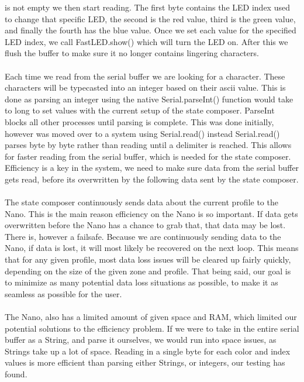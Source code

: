 \documentclass[onecolumn, draftclsnofoot,10pt, compsoc]{IEEEtran}
\begin{document}
	is not empty we then start reading. The first byte contains the LED index used
	to change that specific LED, the second is the red value, third is the green
	value, and finally the fourth has the blue value.  Once we set each value for
	the specified LED index, we call FastLED.show() which will turn the LED on.
	After this we flush the buffer to make sure it no longer contains lingering characters.
 	\\\\
	\noindent Each time we read from the serial buffer we are looking for a character. These
	characters will be typecasted into an integer based on their ascii value.
	This is done as parsing an integer using the native Serial.parseInt() function
	would take to long to set values with the current setup of the state composer.
	ParseInt blocks all other processes until parsing is complete. This was done
	initially, however was moved over to a system using Serial.read() instead
	Serial.read() parses byte by byte rather than reading until a delimiter is
	reached. This allows for faster reading from the serial buffer, which is
	needed for the state composer. Efficiency is a key in the system, we need to
	make sure data from the serial buffer gets read, before its overwritten by the
	following data sent by the state composer.
	\\\\
	\noindent The state composer continuously sends data about the current profile to the
	Nano. This is the main reason efficiency on the Nano is so important. If data
	gets overwritten before the Nano has a chance to grab that, that data may be
	lost. There is, however a failsafe. Because we are continuously sending data
	to the Nano, if data is lost, it will most likely be recovered on the next
	loop. This means that for any given profile, most data loss issues will be
	cleared up fairly quickly, depending on the size of the given zone and profile.
	That being said, our goal is to minimize as many potential data loss situations
	as possible, to make it as seamless as possible for the user.
	\\\\
	\noindent The Nano, also has a limited amount of given space and RAM, which limited our
	potential solutions to the efficiency problem. If we were to take in the entire
	serial buffer as a String, and parse it ourselves, we would run into space
	issues, as Strings take up a lot of space. Reading in a single byte for each
	color and index values is more efficient than parsing either Strings, or
	integers, our testing has found.
\end{document}
